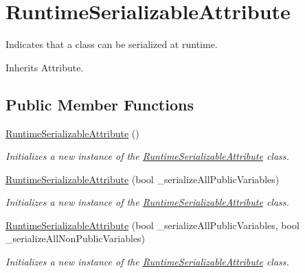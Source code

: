 \hypertarget{class_voxel_busters_1_1_runtime_serialization_1_1_runtime_serializable_attribute}{}\section{Runtime\+Serializable\+Attribute}
\label{class_voxel_busters_1_1_runtime_serialization_1_1_runtime_serializable_attribute}


Indicates that a class can be serialized at runtime.  




Inherits Attribute.

\subsection*{Public Member Functions}
\begin{DoxyCompactItemize}
\item 
\hyperlink{class_voxel_busters_1_1_runtime_serialization_1_1_runtime_serializable_attribute_aa3cb2cc3689fb86c9017b0a719be2752}{Runtime\+Serializable\+Attribute} ()
\begin{DoxyCompactList}\small\item\em Initializes a new instance of the \hyperlink{class_voxel_busters_1_1_runtime_serialization_1_1_runtime_serializable_attribute}{Runtime\+Serializable\+Attribute} class. \end{DoxyCompactList}\item 
\hyperlink{class_voxel_busters_1_1_runtime_serialization_1_1_runtime_serializable_attribute_aad88c45dd08a7aa5fe22b8be15ed6c89}{Runtime\+Serializable\+Attribute} (bool \+\_\+serialize\+All\+Public\+Variables)
\begin{DoxyCompactList}\small\item\em Initializes a new instance of the \hyperlink{class_voxel_busters_1_1_runtime_serialization_1_1_runtime_serializable_attribute}{Runtime\+Serializable\+Attribute} class. \end{DoxyCompactList}\item 
\hyperlink{class_voxel_busters_1_1_runtime_serialization_1_1_runtime_serializable_attribute_a2905def45da7c64fc82be1b7d8a06953}{Runtime\+Serializable\+Attribute} (bool \+\_\+serialize\+All\+Public\+Variables, bool \+\_\+serialize\+All\+Non\+Public\+Variables)
\begin{DoxyCompactList}\small\item\em Initializes a new instance of the \hyperlink{class_voxel_busters_1_1_runtime_serialization_1_1_runtime_serializable_attribute}{Runtime\+Serializable\+Attribute} class. \end{DoxyCompactList}\end{DoxyCompactItemize}


